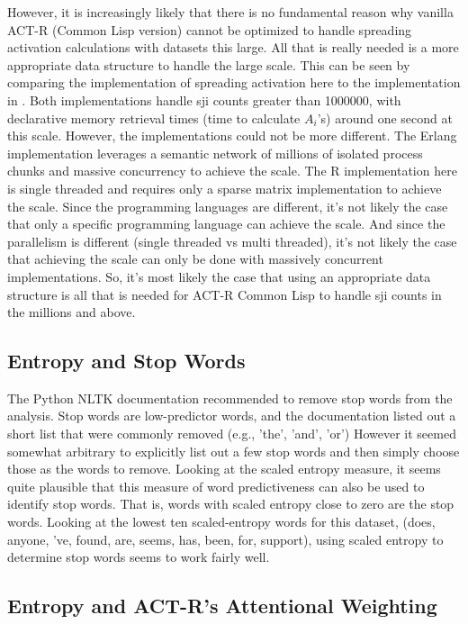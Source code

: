 \documentclass[10pt,letterpaper]{article}
\begin{document}
However, it is increasingly likely that there is no fundamental reason why vanilla ACT-R (Common Lisp version) cannot be optimized to handle spreading activation calculations with datasets this large.
All that is really needed is a more appropriate data structure to handle the large scale.
This can be seen by comparing the implementation of spreading activation here to the implementation in .
Both implementations handle sji counts greater than \num{1000000}, with declarative memory retrieval times (time to calculate $A_{i}$'s) around one second at this scale.
However, the implementations could not be more different.
The Erlang implementation leverages a semantic network of millions of isolated process chunks and massive concurrency to achieve the scale.
The R implementation here is single threaded and requires only a sparse matrix implementation to achieve the scale.
Since the programming languages are different, it's not likely the case that only a specific programming language can achieve the scale.
And since the parallelism is different (single threaded vs multi threaded), it's not likely the case that achieving the scale can only be done with massively concurrent implementations.
So, it's most likely the case that using an appropriate data structure is all that is needed for ACT-R Common Lisp to handle sji counts in the millions and above.

\subsection{Entropy and Stop Words}

The Python NLTK documentation \cite{Bird2009} recommended to remove stop words from the analysis.
Stop words are low-predictor words, and the documentation listed out a short list that were commonly removed (e.g., 'the', 'and', 'or')
However it seemed somewhat arbitrary to explicitly list out a few stop words and then simply choose those as the words to remove.
Looking at the scaled entropy measure, it seems quite plausible that this measure of word predictiveness can also be used to identify stop words.
That is, words with scaled entropy close to zero are the stop words.
Looking at the lowest ten scaled-entropy words for this dataset, (does, anyone, 've, found, are, seems, has, been, for, support), using scaled entropy to determine stop words seems to work fairly well.

\subsection{Entropy and ACT-R's Attentional Weighting}
\end{document}
